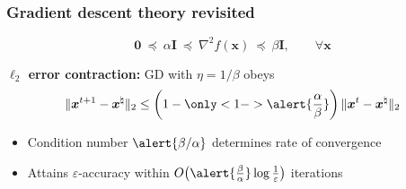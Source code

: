 \documentclass[compress,
mathserif,wide,%
]{beamer}
\begin{document}
\begin{frame}
	\frametitle{Gradient descent theory revisited}


	\[
		\bm{0} ~\preceq~ \alpha \bm{I} ~\preceq~ \nabla^2 f(\bm{x})  ~\preceq~ \beta \bm{I}, \qquad \forall \bm{x}
	\]


{

\begin{varblock}[\textwidth]{}
  	{\bf $\ell_2$ error contraction:} GD with $\eta = 1/{\beta}$ obeys
	\vspace{-0.3em}
	\[
		\|\bm{x}^{t+1} -\bm{x}^\natural\|_2 \leq \left(1- \only<1->{\alert{\frac{\alpha}{\beta}}} \right)\|\bm{x}^{t} -\bm{x}^\natural\|_2
	\]
\end{varblock}
}



\begin{itemize}
	\itemsep0.5em
	\item Condition number $\alert{\beta / \alpha}$ determines rate of convergence
	\pause
	\item Attains $\varepsilon$-accuracy within $O\big( \alert{ \frac{\beta}{\alpha} } \log\frac{1}{\varepsilon} \big)$ iterations
\end{itemize}

\end{frame}
\end{document}

